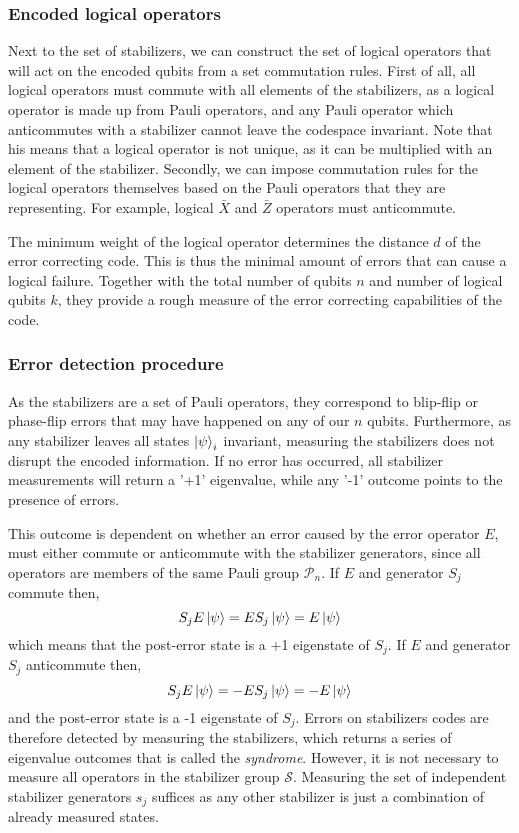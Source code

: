 \subsubsection{Encoded logical operators}

Next to the set of stabilizers, we can construct the set of logical operators that will act on the encoded qubits from a set commutation rules. First of all, all logical operators must commute with all elements of the stabilizers, as a logical operator is made up from Pauli operators, and any Pauli operator which anticommutes with a stabilizer cannot leave the codespace invariant. Note that his means that a logical operator is not unique, as it can be multiplied with an element of the stabilizer. Secondly, we can impose commutation rules for the logical operators themselves based on the Pauli operators that they are representing. For example, logical $\bar{X}$ and $\bar{Z}$ operators must anticommute.

The minimum weight of the logical operator determines the distance $d$ of the error correcting code. This is thus the minimal amount of errors that can cause a logical failure. Together with the total number of qubits $n$ and number of logical qubits $k$, they provide a rough measure of the error correcting capabilities of the code.

\subsubsection{Error detection procedure}

As the stabilizers are a set of Pauli operators, they correspond to blip-flip or phase-flip errors that may have happened on any of our $n$ qubits. Furthermore, as any stabilizer leaves all states  $\ket{\psi}_i$ invariant, measuring the stabilizers does not disrupt the encoded information. If no error has occurred, all stabilizer measurements will return a '+1' eigenvalue, while any '-1' outcome points to the presence of errors.

This outcome is dependent on whether an error caused by the error operator $E$, must either commute or anticommute with the stabilizer generators, since all operators are members of the same Pauli group $\mathcal{P}_n$. If $E$ and generator $S_j$ commute then,
\begin{equation}
  S_jE\ket{\psi} = ES_j\ket{\psi} = E\ket{\psi}
\end{equation}
which means that the post-error state is a +1 eigenstate of $S_j$. If $E$ and generator $S_j$ anticommute then,
\begin{equation}
  S_jE\ket{\psi} = -ES_j\ket{\psi} = -E\ket{\psi}
\end{equation}
and the post-error state is a -1 eigenstate of $S_j$. Errors on stabilizers codes are therefore detected by measuring the stabilizers, which returns a series of eigenvalue outcomes that is called the \emph{syndrome}. However, it is not necessary to measure all operators in the stabilizer group $\mathcal{S}$. Measuring the set of independent stabilizer generators $s_j$ suffices as any other stabilizer is just a combination of already measured states.

